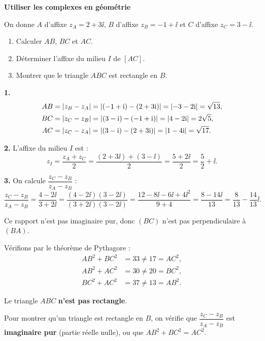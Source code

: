 
\exerciceresolu
\textbf{Utiliser les complexes en géométrie}

On donne $A$ d'affixe $z_A = 2 + 3\ii$, $B$ d'affixe $z_B = -1 + \ii$
et $C$ d'affixe $z_C = 3 - \ii$.

\begin{enumerate}
	\item Calculer $AB$, $BC$ et $AC$.
	\item Déterminer l'affixe du milieu $I$ de $[AC]$.
	\item Montrer que le triangle $ABC$ est rectangle en $B$.
\end{enumerate}

\solution

\textbf{1.}
$$
\begin{aligned}
	AB &= \left|z_B - z_A\right| = \left|(-1+\mathrm{i})-(2+3\mathrm{i})\right| = \left|-3-2\mathrm{i}\right| = \sqrt{13},\\
	BC &= \left|z_C - z_B\right| = \left|(3-\mathrm{i})-(-1+\mathrm{i})\right| = \left|4-2\mathrm{i}\right| = 2\sqrt{5},\\
	AC &= \left|z_C - z_A\right| = \left|(3-\mathrm{i})-(2+3\mathrm{i})\right| = \left|1-4\mathrm{i}\right| = \sqrt{17}.
\end{aligned}
$$

\textbf{2.} L'affixe du milieu $I$ est :
$$
z_I = \frac{z_A + z_C}{2} = \frac{(2+3\ii)+(3-\ii)}{2} = \frac{5+2\ii}{2} = \frac{5}{2} + \ii.
$$

\textbf{3.} On calcule $\dfrac{z_C - z_B}{z_A - z_B}$ :
$$
\frac{z_C - z_B}{z_A - z_B}
= \frac{4 - 2\ii}{3 + 2\ii}
= \frac{(4-2\ii)(3-2\ii)}{(3+2\ii)(3-2\ii)}
= \frac{12 - 8\ii - 6\ii + 4\ii^2}{9+4}
= \frac{8 - 14\ii}{13}
= \frac{8}{13} - \frac{14}{13}\ii.
$$

Ce rapport n'est pas imaginaire pur, donc $(BC)$ n'est pas perpendiculaire à $(BA)$.

Vérifions par le théorème de Pythagore :
$$
\begin{aligned}
	AB^2 + BC^2 &= 33 \neq 17 = AC^2,\\
	AB^2 + AC^2 &= 30 \neq 20 = BC^2,\\
	BC^2 + AC^2 &= 37 \neq 13 = AB^2.
\end{aligned}
$$

Le triangle $ABC$ \textbf{n'est pas rectangle}.

\begin{attention}
	Pour montrer qu'un triangle est rectangle en $B$, on vérifie que
	$\dfrac{z_C - z_B}{z_A - z_B}$ est \textbf{imaginaire pur}
	(partie réelle nulle), ou que $AB^2 + BC^2 = AC^2$.
\end{attention}


